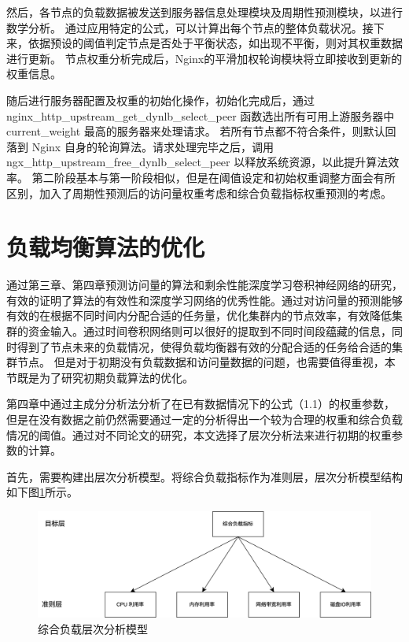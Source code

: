 然后，各节点的负载数据被发送到服务器信息处理模块及周期性预测模块，以进行数学分析。
通过应用特定的公式，可以计算出每个节点的整体负载状况。接下来，依据预设的阈值判定节点是否处于平衡状态，如出现不平衡，则对其权重数据进行更新。
节点权重分析完成后，Nginx的平滑加权轮询模块将立即接收到更新的权重信息。

随后进行服务器配置及权重的初始化操作，初始化完成后，通过 nginx\_http\_upstream\_get\_dynlb\_select\_peer
函数选出所有可用上游服务器中 current\_weight 最高的服务器来处理请求。
若所有节点都不符合条件，则默认回落到 Nginx 自身的轮询算法。请求处理完毕之后，调用 ngx\_http\_upstream\_free\_dynlb\_select\_peer 以释放系统资源，以此提升算法效率。
第二阶段基本与第一阶段相似，但是在阈值设定和初始权重调整方面会有所区别，加入了周期性预测后的访问量权重考虑和综合负载指标权重预测的考虑。

\section{负载均衡算法的优化}
通过第三章、第四章预测访问量的算法和剩余性能深度学习卷积神经网络的研究，有效的证明了算法的有效性和深度学习网络的优秀性能。通过对访问量的预测能够有效的在根据不同时间内分配合适的任务量，优化集群内的节点效率，有效降低集群的资金输入。通过时间卷积网络则可以很好的提取到不同时间段蕴藏的信息，同时得到了节点未来的负载情况，使得负载均衡器有效的分配合适的任务给合适的集群节点。
但是对于初期没有负载数据和访问量数据的问题，也需要值得重视，本节既是为了研究初期负载算法的优化。

第四章中通过主成分分析法分析了在已有数据情况下的公式（1.1）的权重参数，但是在没有数据之前仍然需要通过一定的分析得出一个较为合理的权重和综合负载情况的阈值。通过对不同论文的研究\cite{吴文辉2013编程计算层次分析法}，本文选择了层次分析法来进行初期的权重参数的计算。

首先，需要构建出层次分析模型\cite{吴陈2020基于Nginx的服务器集群负载均衡策略的研究与改进}。将综合负载指标作为准则层，层次分析模型结构如下图\ref{Layered_Analysis}所示。

\begin{figure}[htbp]
	\centering
	\includegraphics[width=\textwidth]{figures/Layered_Analysis.jpg}
	\caption{综合负载层次分析模型}
	\label{Layered_Analysis}
\end{figure}

